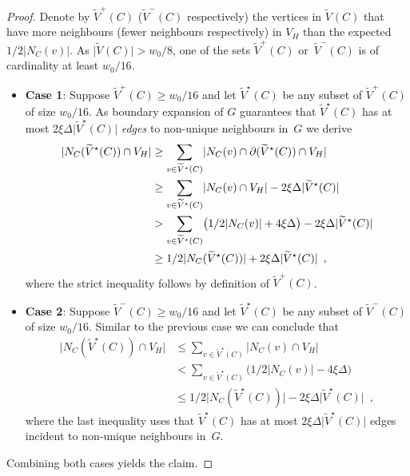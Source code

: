 \documentclass{article}
\providecommand{\abs}[1]{\lvert#1\rvert}
\providecommand{\Abs}[1]{\bigl\lvert#1\bigr\rvert}
\newcommand{\boundary}[1]{\ensuremath{\partial #1}}
\newcommand{\setsize}[1]{\lvert#1\rvert}
\newcommand{\eqcomma}{\enspace ,}
\newcommand{\neigh}[2][]{N_{{#1}}(#2)}
\newcommand{\uniqueneigh}[2][]{\boundary_{{#1}} ({#2})}
\newcommand{\diff}{\xi}
\newcommand{\GdegMax}{\Delta}
\newcommand{\V}[1][]{V_{#1}}
\newcommand{\Vh}{\V[H]}
\newcommand{\Vbad}[2][]{\widetilde V^{#1}(#2)}
\numberwithin{equation}{section}
\begin{document}
\begin{proof}
  Denote by $\Vbad[+]{C}$ ($\Vbad[-]{C}$ respectively) the vertices
  in $\Vbad{C}$ that have more neighbours (fewer neighbours respectively) in 
  $\Vh$ than the expected $1/2\Abs{ \neigh[C]{v} }$. As
  $\setsize{ \Vbad{C} } > w_0/8$, one of the sets 
  $\Vbad[+]{C}$ or~$\Vbad[-]{C}$
  is of cardinality at least $w_0/16$. 
  \begin{itemize}
  \item[] \textbf{Case 1}: Suppose 
    $\Vbad[+]{C} \geq w_0/16$ and let
    $\Vbad[\star]{C}$ be any subset of $\Vbad[+]{C}$ of 
    size $w_0/16$.
    As boundary expansion of $G$ guarantees 
    that $\Vbad[\star]{C}$ has at most 
    $2 \diff \GdegMax \setsize{ \Vbad[\star]{C} }$ \emph{edges} 
    to non-unique neighbours in~$G$ we derive
    \begin{align}
      \abs{ \neigh[C]{ \Vbad[\star]{C} } \cap \Vh } 
      &\ge \sum_{v \in\Vbad[\star]{C}} 
        \setsize{ \neigh[C]{v} \cap \uniqueneigh{\Vbad[\star]{C}} \cap \Vh }\\
      &\ge \sum_{v \in\Vbad[\star]{C}} \setsize{ \neigh[C]{v} \cap \Vh } - 
        2 \diff \GdegMax \setsize{\Vbad[\star]{C}}\\
      &> \sum_{v \in \Vbad[\star]{C}} 
        \bigl( 1/2\setsize{ \neigh[C]{v} } + 
        4 \diff \GdegMax  \bigr) -
        2 \diff \GdegMax \setsize{\Vbad[\star]{C}}\\
      &\ge 1/2 \abs{ \neigh[C]{ \Vbad[\star]{C} } } + 
        2 \diff \GdegMax \setsize{\Vbad[\star]{C}} \eqcomma
    \end{align}
    where the strict inequality follows by definition of $\Vbad[+]{C}$.
  \item[] \textbf{Case 2}: Suppose 
    $\Vbad[-]{C}  \geq w_0/16$ and let
    $\Vbad[\star]{C}$ be any subset of $\Vbad[-]{C}$ of 
    size $w_0/16$. Similar to the previous case we can conclude that
    \begin{align}
      \abs{ \neigh[C]{ \Vbad[\star]{C} } \cap \Vh } 
      &\le \sum_{v \in \Vbad[\star]{C}} \setsize{ \neigh[C]{v} \cap \Vh }\\
      &< \sum_{v \in \Vbad[\star]{C}} 
        \bigl( 1/2\setsize{ \neigh[C]{v} } -
        4 \diff \GdegMax  \bigr) \\
      &\leq 1/2 \abs{ \neigh[C]{ \Vbad[\star]{C} } } -
        2 \diff \GdegMax \setsize{\Vbad[\star]{C}} \eqcomma
    \end{align} 
    where the last inequality uses that  $\Vbad[\star]{C}$ has at most 
    $2 \diff \GdegMax \setsize{ \Vbad[\star]{C} }$ edges incident
    to non-unique neighbours in~$G$.
\end{itemize}
  Combining both cases yields the claim.
\end{proof}
\end{document}
